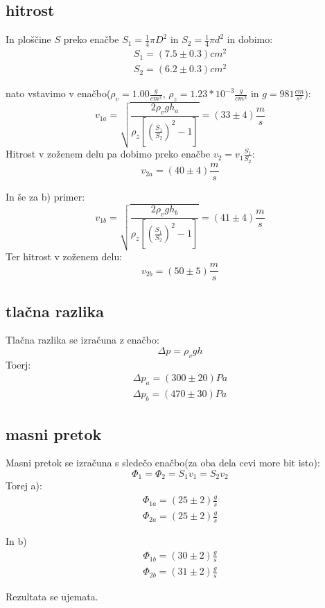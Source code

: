 \documentclass[11pt]{article}
\begin{document}
    \subsection{hitrost}
    In ploščine $S$ preko enačbe $S_1 =\frac{1}{4} \pi D^2 $ in $S_2 =\frac{1}{4} \pi d^2 $ in dobimo:
    \begin{align*}
        S_1 = (7.5 \pm 0.3) cm^2 \\
        S_2 = (6.2 \pm 0.3) cm^2
    \end{align*}

    nato vstavimo v enačbo($\rho_v = 1.00 \frac{g}{cm^3}$, $\rho_z = 1.23*10^{-3} \frac{g}{cm^3}$ in $g = 981 \frac{cm}{s^2}$):
    \[
        v_{1a} = \sqrt{\frac{2 \rho_v g h_a }{\rho_z[(\frac{S_1}{S_2})^2 -1]}} = (33 \pm 4) \frac{m}{s}
    \]
    Hitrost v zoženem delu pa dobimo preko enačbe $v_2 = v_1 \frac{S_1}{S_2}$:
    \[
        v_{2a} = (40 \pm 4) \frac{m}{s}
    \]

    In še za b) primer:
    \[
        v_{1b} = \sqrt{\frac{2 \rho_v g h_b }{\rho_z[(\frac{S_1}{S_2})^2 -1]}} = (41 \pm 4) \frac{m}{s}
    \]
    Ter hitrost v zoženem delu:
    \[
        v_{2b} = (50 \pm 5) \frac{m}{s}
    \]
    \subsection{tlačna razlika}
    Tlačna razlika se izračuna z enačbo:
    \[
        \Delta p = \rho_v g h
    \]
    Toerj:
    \begin{align*}
        \Delta p_a = (300 \pm 20) Pa \\
        \Delta p_b = ( 470 \pm 30) Pa
    \end{align*}

    \subsection{masni pretok}
    Masni pretok se izračuna s sledečo enačbo(za oba dela cevi more bit isto):
    \[
        \Phi_{1} = \Phi_{2} = S_1 v_1 = S_2 v_2
    \]
    Torej a):
    \begin{align*}
        \Phi_{1a} = (25 \pm 2 ) \frac{g}{s} \\
        \Phi_{2a} = (25 \pm 2) \frac{g}{s}
    \end{align*}

    In b)
    \begin{align*}
        \Phi_{1b} = (30 \pm 2 )\frac{g}{s}  \\
        \Phi_{2b} = (31 \pm 2) \frac{g}{s}
    \end{align*}

    Rezultata se ujemata.
\end{document}
